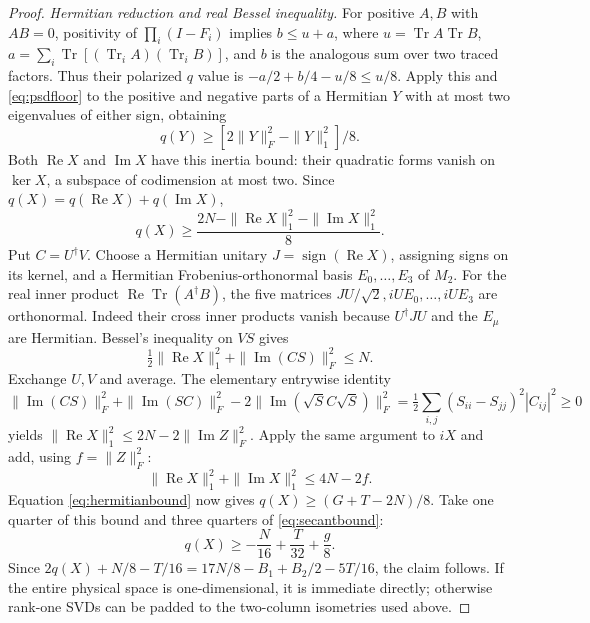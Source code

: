\begin{proof}
\smallskip\noindent\emph{Hermitian reduction and real Bessel inequality.}
For positive $A,B$ with $AB=0$, positivity of
$\prod_i(I-F_i)$ implies $b\le u+a$, where
$u=\operatorname{Tr}A\operatorname{Tr}B$,
$a=\sum_i\operatorname{Tr}[(\operatorname{Tr}_iA)(\operatorname{Tr}_iB)]$,
and $b$ is the analogous sum over two traced factors.
Thus their polarized $q$ value is
$-a/2+b/4-u/8\le u/8$.
Apply this and \eqref{eq:psdfloor} to the positive and negative parts of a Hermitian $Y$
with at most two eigenvalues of either sign, obtaining
\[
 q(Y)\ge[2\|Y\|_F^2-\|Y\|_1^2]/8.
\]
Both $\operatorname{Re}X$ and $\operatorname{Im}X$ have this inertia bound:
their quadratic forms vanish on $\ker X$, a subspace of codimension at most two.
Since $q(X)=q(\operatorname{Re}X)+q(\operatorname{Im}X)$,
\begin{equation}
 q(X)\ge\frac{2N-\|\operatorname{Re}X\|_1^2
                       -\|\operatorname{Im}X\|_1^2}{8}.
 \label{eq:hermitianbound}
\end{equation}
Put $C=U^\dagger V$. Choose a Hermitian unitary
$J=\operatorname{sign}(\operatorname{Re}X)$, assigning signs on its kernel,
and a Hermitian Frobenius-orthonormal basis $E_0,\ldots,E_3$ of $M_2$.
For the real inner product $\operatorname{Re}\operatorname{Tr}(A^\dagger B)$,
the five matrices $JU/\sqrt2,iUE_0,\ldots,iUE_3$ are orthonormal.
Indeed their cross inner products vanish because $U^\dagger JU$ and
the $E_\mu$ are Hermitian. Bessel's inequality on $VS$ gives
\[
 \tfrac12\|\operatorname{Re}X\|_1^2+\|\operatorname{Im}(CS)\|_F^2\le N.
\]
Exchange $U,V$ and average. The elementary entrywise identity
\[
 \|\operatorname{Im}(CS)\|_F^2+\|\operatorname{Im}(SC)\|_F^2
 -2\|\operatorname{Im}(\sqrt S C\sqrt S)\|_F^2
 =\tfrac12\sum_{i,j}(S_{ii}-S_{jj})^2|C_{ij}|^2\ge0
\]
yields $\|\operatorname{Re}X\|_1^2\le2N-2\|\operatorname{Im}Z\|_F^2$.
Apply the same argument to $iX$ and add, using $f=\|Z\|_F^2$:
\[
 \|\operatorname{Re}X\|_1^2+\|\operatorname{Im}X\|_1^2\le4N-2f.
\]
Equation \eqref{eq:hermitianbound} now gives $q(X)\ge(G+T-2N)/8$.
Take one quarter of this bound and three quarters of \eqref{eq:secantbound}:
\[
 q(X)\ge-\frac N{16}+\frac T{32}+\frac g8.
\]
Since $2q(X)+N/8-T/16=17N/8-B_1+B_2/2-5T/16$, the claim follows.
If the entire physical space is one-dimensional, it is immediate directly;
otherwise rank-one SVDs can be padded to the two-column isometries used above.
\end{proof}
